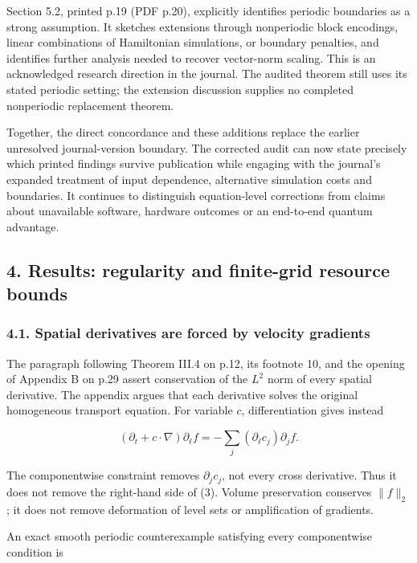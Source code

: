 Section 5.2, printed p.19 (PDF p.20), explicitly identifies periodic
boundaries as a strong assumption. It sketches extensions through
nonperiodic block encodings, linear combinations of Hamiltonian
simulations, or boundary penalties, and identifies further analysis
needed to recover vector-norm scaling. This is an acknowledged research
direction in the journal. The audited theorem still uses its stated
periodic setting; the extension discussion supplies no completed
nonperiodic replacement theorem.

Together, the direct concordance and these additions replace the earlier
unresolved journal-version boundary. The corrected audit can now state
precisely which printed findings survive publication while engaging with
the journal's expanded treatment of input dependence, alternative
simulation costs and boundaries. It continues to distinguish
equation-level corrections from claims about unavailable software,
hardware outcomes or an end-to-end quantum advantage.

\subsection{4. Results: regularity and finite-grid resource
bounds}\label{results-regularity-and-finite-grid-resource-bounds}

\subsubsection{4.1. Spatial derivatives are forced by velocity
gradients}\label{spatial-derivatives-are-forced-by-velocity-gradients}

The paragraph following Theorem III.4 on p.12, its footnote 10, and the
opening of Appendix B on p.29 assert conservation of the \(L^2\) norm of
every spatial derivative. The appendix argues that each derivative
solves the original homogeneous transport equation. For variable \(c\),
differentiation gives instead

\[
(\partial_t+c\cdot\nabla)\partial_\ell f
=-\sum_j(\partial_\ell c_j)\partial_j f. \tag{3}
\]

The componentwise constraint removes \(\partial_jc_j\), not every cross
derivative. Thus it does not remove the right-hand side of (3). Volume
preservation conserves \(\|f\|_2\); it does not remove deformation of
level sets or amplification of gradients.

An exact smooth periodic counterexample satisfying every componentwise
condition is

